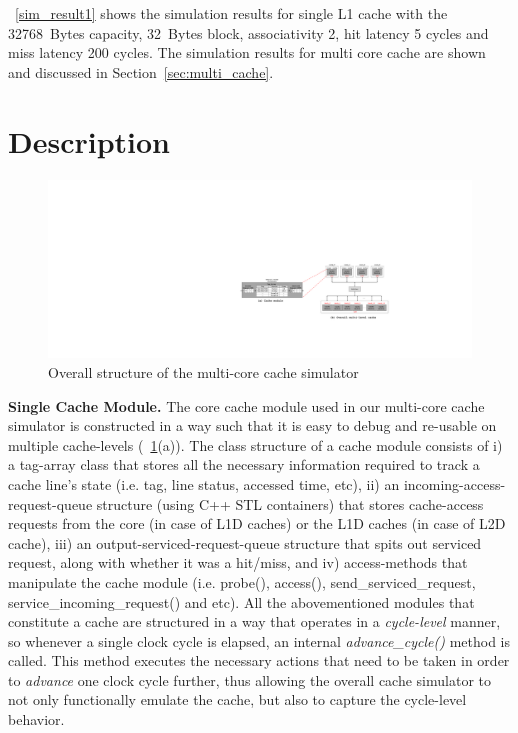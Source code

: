 \documentclass[12pt]{report}
\newcommand{\Fig}[1]{\figurename~\ref{#1}}
\newcommand{\Tbl}[1]{\tablename~\ref{#1}}
\newcommand{\Sec}[1]{Section~\ref{#1}}
\begin{document}
\Tbl{sim_result1} shows the simulation results for single L1 cache with the 32768~Bytes capacity, 32~Bytes block, associativity 2, hit latency 5 cycles and miss latency 200 cycles. The simulation results for multi core cache are shown and discussed in \Sec{sec:multi_cache}.



\newpage
\section{Description}
\begin{figure}[!h]
\begin{minipage}[b]{\textwidth}
 \centering
 \includegraphics[trim=0mm 0mm 0mm 0mm,clip,width=0.98\linewidth]{figs/cache_structure.pdf}
 \caption{Overall structure of the multi-core cache simulator}
 \label{fig:cache_structure}
\end{minipage}
\end{figure}

\textbf{Single Cache Module.} The core cache module used in our multi-core cache simulator is constructed in a way such that it is easy to debug and re-usable on multiple 
cache-levels (\Fig{fig:cache_structure}(a)). The class structure of a cache module consists of i) a tag-array
class that stores all the necessary information required to track a cache line's state (i.e. tag, line status, accessed time, etc), 
ii) an incoming-access-request-queue structure (using C++ STL containers) that stores cache-access requests from the core (in case of L1D caches) or
the L1D caches (in case of L2D cache), iii) an output-serviced-request-queue structure that spits out serviced request, along with whether
it was a hit/miss, and iv) access-methods that manipulate the cache module (i.e. probe(), access(), send\_serviced\_request, service\_incoming\_request()
and etc). All the abovementioned modules that constitute a cache are structured in a way that operates in a \emph{cycle-level} manner, 
so whenever a single clock cycle is elapsed, an internal \emph{advance\_cycle()} method is called. This method executes the necessary actions that
need to be taken in order to \emph{advance} one clock cycle further, thus allowing the overall cache simulator to not only functionally
emulate the cache, but also to capture the cycle-level behavior. 
\end{document}
